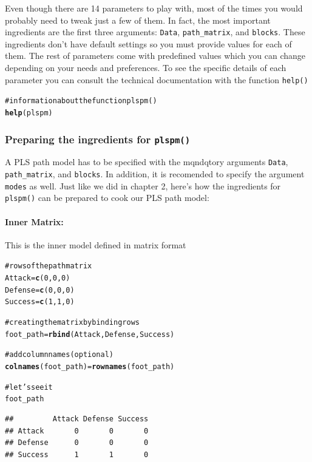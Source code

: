 \documentclass[12pt]{book}\usepackage{graphicx, color}
\makeatletter
\newcommand{\hlfunctioncall}[1]{\textcolor[rgb]{0.501960784313725,0,0.329411764705882}{\textbf{#1}}}%
\newcommand{\hlcomment}[1]{\textcolor[rgb]{0.180392156862745,0.6,0.341176470588235}{#1}}%
\newenvironment{kframe}{%
 \def\at@end@of@kframe{}%
 \ifinner\ifhmode%
  \def\at@end@of@kframe{\end{minipage}}%
  \begin{minipage}{\columnwidth}%
 \fi\fi%
 \def\FrameCommand##1{\hskip\@totalleftmargin \hskip-\fboxsep
 \colorbox{shadecolor}{##1}\hskip-\fboxsep
     \hskip-\linewidth \hskip-\@totalleftmargin \hskip\columnwidth}%
 \MakeFramed {\advance\hsize-\width
   \@totalleftmargin\z@ \linewidth\hsize
   \@setminipage}}%
 {\par\unskip\endMakeFramed%
 \at@end@of@kframe}
\newenvironment{knitrout}{}{} %
\newcommand{\fplspm}{\texttt{plspm()}}
\newcommand{\code}[1]{\texttt{#1}}
\makeatother
\begin{document}
\vspace{2mm}
Even though there are 14 parameters to play with, most of the times you would probably need to tweak just a few of them. In fact, the most important ingredients are the first three arguments: \code{Data}, \code{path\_matrix}, and \code{blocks}. These ingredients don't have default settings so you must provide values for each of them. The rest of parameters come with predefined values which you can change depending on your needs and preferences. To see the specific details of each parameter you can consult the technical documentation with the function \code{help()}
\begin{knitrout}
\color{fgcolor}\begin{kframe}
\begin{alltt}
\hlcomment{# information about the function plspm()}
\hlfunctioncall{help}(plspm)
\end{alltt}
\end{kframe}
\end{knitrout}




\subsubsection*{Preparing the ingredients for \fplspm{}}
A PLS path model has to be specified with the mqndqtory arguments \code{Data}, \code{path\_matrix}, and \code{blocks}. In addition, it is recomended to specify the argument \code{modes} as well. Just like we did in chapter 2, here's how the ingredients for \fplspm{} can be prepared to cook our PLS path model:

\paragraph{Inner Matrix:} 
This is the inner model defined in matrix format
\begin{knitrout}
\color{fgcolor}\begin{kframe}
\begin{alltt}
\hlcomment{# rows of the path matrix}
Attack = \hlfunctioncall{c}(0, 0, 0)
Defense = \hlfunctioncall{c}(0, 0, 0)
Success = \hlfunctioncall{c}(1, 1, 0)

\hlcomment{# creating the matrix by binding rows}
foot_path = \hlfunctioncall{rbind}(Attack, Defense, Success)

\hlcomment{# add column names (optional)}
\hlfunctioncall{colnames}(foot_path) = \hlfunctioncall{rownames}(foot_path)

\hlcomment{# let's see it}
foot_path
\end{alltt}
\begin{verbatim}
##         Attack Defense Success
## Attack       0       0       0
## Defense      0       0       0
## Success      1       1       0
\end{verbatim}
\end{kframe}
\end{knitrout}
\end{document}
